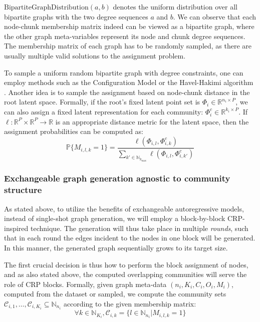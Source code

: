 $\text{BipartiteGraphDistribution}(a,b)$ denotes the uniform distribution over all bipartite graphs with the two degree sequences $a$ and $b$. We can observe that each node-chunk membership matrix indeed can be viewed as a bipartite graph, where the other graph meta-variables represent its node and chunk degree sequences. The membership matrix of each graph has to be randomly sampled, as there are usually multiple valid solutions to the assignment problem. 
    
To sample a uniform random bipartite graph with degree constraints, one can employ methods such as the Configuration Model \cite{newman_structure_2003} or the Havel-Hakimi algorithm \cite{hakimi_realizability_1963, kleitman_algorithms_1973}. Another idea is to sample the assignment based on node-chunk distance in the root latent space. Formally, if the root's fixed latent point set is $\Phi_i \in \mathbb{R}^{n_i \times P}$, we can also assign a fixed latent representation for each community: $\Phi^c_i \in \mathbb{R}^{k_i \times P}$. If $\ell: \mathbb{R}^{P} \times \mathbb{R}^{P} \to \mathbb{R}$ is an appropriate distance metric for the latent space, then the assignment probabilities can be computed as: $$\mathbb{P}\{M_{i,l,k}=1\}=\frac{\ell(\Phi_{i,l},\Phi^c_{i,k})}{\sum_{k' \in \mathbb{N}_{k_{\max}}}{\ell(\Phi_{i,l},\Phi^c_{i,k'})}}$$

\subsubsection{Exchangeable graph generation agnostic to community structure}
As stated above, to utilize the benefits of exchangeable autoregressive models, instead of single-shot graph generation, we will employ a block-by-block CRP-inspired technique. The generation will thus take place in multiple \emph{rounds}, such that in each round the edges incident to the nodes in one block will be generated. In this manner, the generated graph sequentially grows to its target size.

The first crucial decision is thus how to perform the block assignment of nodes, and as also stated above, the computed overlapping communities will serve the role of CRP blocks. Formally, given graph meta-data $(n_i, K_i, C_i, O_i, M_i)$, computed from the dataset or sampled, we compute the community sets $\mathcal{C}_{i,1},\dots,\mathcal{C}_{i,K_i} \subseteq \mathbb{N}_{n_i}$ according to the given membership matrix: $$\forall k \in \mathbb{N}_{K_i},\mathcal{C}_{i,k}=\{l \in \mathbb{N}_{n_i}| M_{i,l,k} = 1\}$$

